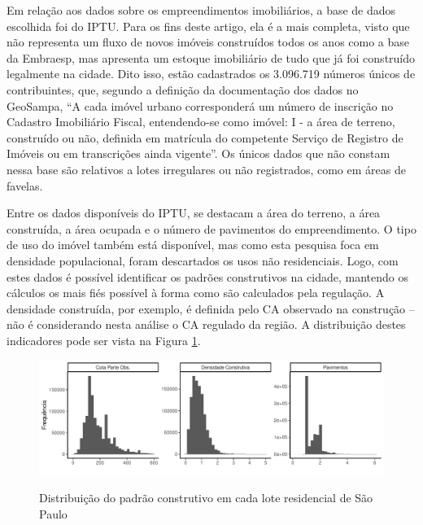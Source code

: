 Em relação aos dados sobre os empreendimentos imobiliários, a base de dados escolhida foi do IPTU. Para os fins deste artigo, ela é a mais completa, visto que não representa um fluxo de novos imóveis construídos todos os anos como a base da Embraesp, mas apresenta um estoque imobiliário de tudo que já foi construído legalmente na cidade. Dito isso, estão cadastrados os 3.096.719 números únicos de contribuintes, que, segundo a definição da documentação dos dados no GeoSampa, ``A cada imóvel urbano corresponderá um número de inscrição no Cadastro Imobiliário Fiscal, entendendo-se como imóvel: I - a área de terreno, construído ou não, definida em matrícula do competente Serviço de Registro de Imóveis ou em transcrições ainda vigente''. Os únicos dados que não constam nessa base são relativos a lotes irregulares ou não registrados, como em áreas de favelas. 

Entre os dados disponíveis do IPTU, se destacam a área do terreno, a área construída, a área ocupada e o número de pavimentos do empreendimento. O tipo de uso do imóvel também está disponível, mas como esta pesquisa foca em densidade populacional, foram descartados os usos não residenciais.  Logo, com estes dados é possível identificar os padrões construtivos na cidade, mantendo os cálculos os mais fiés possível à forma como são calculados pela regulação. A densidade construída, por exemplo, é definida pelo CA observado na construção -- não é considerando nesta análise o CA regulado da região. A distribuição destes indicadores pode ser vista na Figura \ref{fig:histogramas}.

\begin{figure}[h]
    \centering
    \caption{Distribuição do padrão construtivo em cada lote residencial de São Paulo}
    \includegraphics[width = \linewidth]{imagens/indicadores.pdf}
    \label{fig:histogramas}
\end{figure}

